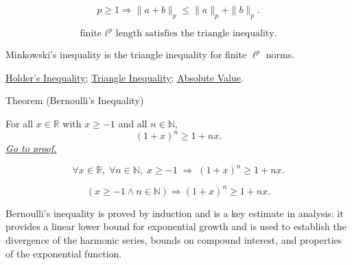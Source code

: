 \begin{remark*}
\[
p\ge1
\Rightarrow
\|a+b\|_p\le \|a\|_p+\|b\|_p.
\]
\end{remark*}

\begin{remark*}
\[
\text{finite } \ell^p\text{ length satisfies the triangle inequality.}
\]
\end{remark*}

\begin{remark*}[Interpretation]
Minkowski's inequality is the triangle inequality for finite $\ell^p$ norms.
\end{remark*}

\begin{dependencies}
\hyperref[thm:ineq-holder]{Holder's Inequality};
\hyperref[thm:triangle-inequality]{Triangle Inequality};
\hyperref[def:absolute-value]{Absolute Value}.
\end{dependencies}


\begin{theorembox}{Theorem (Bernoulli's Inequality)}
\begin{theorem}
\label{thm:ineq-bernoulli}
For all $x \in \mathbb{R}$ with $x \ge -1$ and all $n \in \mathbb{N}$,
\[
  (1 + x)^n \ge 1 + nx.
\]
\hyperref[prf:ineq-bernoulli]{\textit{Go to proof.}}
\end{theorem}
\end{theorembox}



\begin{remark*}
\[
  \forall x \in \mathbb{R},\;
  \forall n \in \mathbb{N},\;
  x \ge -1 \;\Rightarrow\;
  (1 + x)^n \ge 1 + nx.
\]
\end{remark*}

\begin{remark*}
\[
(x\ge -1\land n\in\mathbb{N})\Rightarrow (1+x)^n\ge 1+nx.
\]
\end{remark*}

\begin{remark*}[Interpretation]
Bernoulli's inequality is proved by induction and is a key estimate in
analysis: it provides a linear lower bound for exponential growth and
is used to establish the divergence of the harmonic series, bounds on
compound interest, and properties of the exponential function.
\end{remark*}

